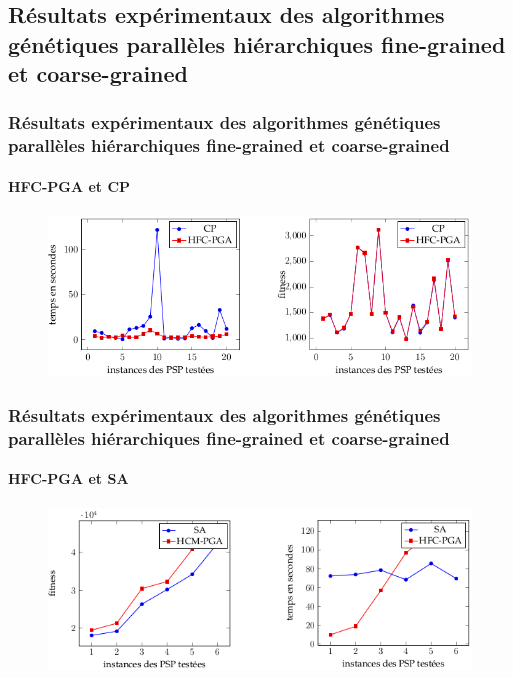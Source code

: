 \documentclass[11pt]{beamer}
\begin{document}
 \subsection{Résultats expérimentaux des algorithmes génétiques parallèles hiérarchiques fine-grained et coarse-grained}
 
 \begin{frame}
 \frametitle{Résultats expérimentaux des algorithmes génétiques parallèles hiérarchiques fine-grained et coarse-grained}
 \framesubtitle{HFC-PGA et CP}
 \begin{figure}[!h]
		\begin{center}
			\includegraphics[scale=.4
			]{img/cp_hfc.png}
		\end{center}
 \end{figure}
 \end{frame}
 
 \begin{frame}
 \frametitle{Résultats expérimentaux des algorithmes génétiques parallèles hiérarchiques fine-grained et coarse-grained}
 \framesubtitle{HFC-PGA et SA}
 \begin{figure}[!h]
		\begin{center}
			\includegraphics[scale=.4
			]{img/sa_hfc.png}
		\end{center}
 \end{figure}
 \end{frame}
 
\end{document}

